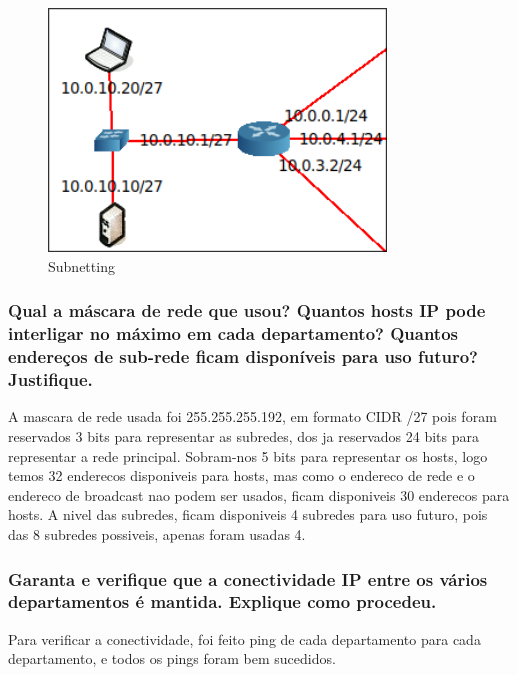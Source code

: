 \documentclass{article}
\begin{document}
\begin{figure}[h]
    \centering
    \includegraphics[width=0.8\textwidth]{images/subnetting.png}
    \caption{\label{fig:subnetting}Subnetting}
\end{figure}

\subsubsection{Qual a máscara de rede que usou? Quantos hosts IP
pode interligar no máximo em cada departamento? Quantos endereços
de sub-rede ficam disponíveis para uso futuro? Justifique.}

A mascara de rede usada foi 255.255.255.192, em formato CIDR /27 pois foram reservados 3 bits para representar as subredes, dos ja reservados 24 bits para representar a rede principal.
Sobram-nos 5 bits para representar os hosts, logo temos 32 enderecos disponiveis para hosts, mas como o endereco de rede e o endereco de broadcast nao podem ser usados, ficam disponiveis 30 enderecos para hosts.
A nivel das subredes, ficam disponiveis 4 subredes para uso futuro, pois das 8 subredes possiveis, apenas foram usadas 4.

\subsubsection{Garanta e verifique que a conectividade IP entre os vários
departamentos é mantida. Explique como procedeu.}

Para verificar a conectividade, foi feito ping de cada departamento para cada departamento, e todos os pings foram bem sucedidos.
\end{document}

